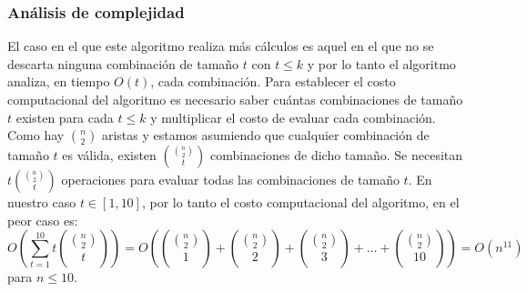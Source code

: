   \subsubsection{Análisis de complejidad}
  El caso en el que este algoritmo realiza más cálculos es aquel en el que no se descarta ninguna
  combinación de tamaño $t$ con $t \leq k$ y por lo tanto el algoritmo analiza, en tiempo $O(t)$,
  cada combinación. Para establecer el costo computacional del algoritmo es necesario saber cuántas
  combinaciones de tamaño $t$ existen para cada $t\leq k$ y multiplicar el costo de evaluar cada
  combinación. Como hay $\binom{n}{2}$ aristas y estamos asumiendo que cualquier combinación de
  tamaño $t$ es válida, existen $\binom{\binom{n}{2}}{t}$ combinaciones de dicho tamaño. Se
  necesitan $t \binom{\binom{n}{2}}{t}$ operaciones para evaluar todas las combinaciones de tamaño
  $t$. En nuestro caso $ t \in [1,10]$, por lo tanto el costo computacional del algoritmo, en el
  peor caso es: \[ \displaystyle O\left( \sum_{t=1}^{10} t\binom{\binom{n}{2}}{t} \right) =
  O\left(\binom{\binom{n}{2}}{1} + \binom{\binom{n}{2}}{2} + \binom{\binom{n}{2}}{3} +\dots+
  \binom{\binom{n}{2}}{10} \right) = O(n^{11})\] para $n\leq 10$.

